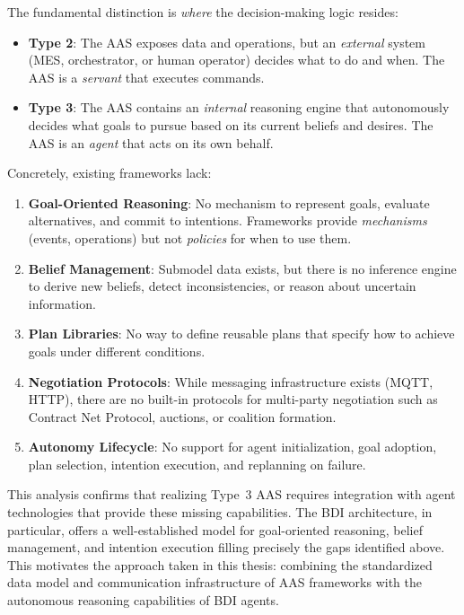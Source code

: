 The fundamental distinction is \textit{where} the decision-making logic resides:

\begin{itemize}
    \item \textbf{Type 2}: The \ac{AAS} exposes data and operations, but an \textit{external} system (MES, orchestrator, or human operator) decides what to do and when. The \ac{AAS} is a \textit{servant} that executes commands.
    
    \item \textbf{Type 3}: The \ac{AAS} contains an \textit{internal} reasoning engine that autonomously decides what goals to pursue based on its current beliefs and desires. The \ac{AAS} is an \textit{agent} that acts on its own behalf.
\end{itemize}

Concretely, existing frameworks lack:
\begin{enumerate}
    \item \textbf{Goal-Oriented Reasoning}: No mechanism to represent goals, evaluate alternatives, and commit to intentions. Frameworks provide \textit{mechanisms} (events, operations) but not \textit{policies} for when to use them.
    
    \item \textbf{Belief Management}: Submodel data exists, but there is no inference engine to derive new beliefs, detect inconsistencies, or reason about uncertain information.
    
    \item \textbf{Plan Libraries}: No way to define reusable plans that specify how to achieve goals under different conditions.
    
    \item \textbf{Negotiation Protocols}: While messaging infrastructure exists (MQTT, HTTP), there are no built-in protocols for multi-party negotiation such as Contract Net Protocol, auctions, or coalition formation.
    
    \item \textbf{Autonomy Lifecycle}: No support for agent initialization, goal adoption, plan selection, intention execution, and replanning on failure.
\end{enumerate}

This analysis confirms that realizing Type~3 \ac{AAS} requires integration with agent technologies that provide these missing capabilities. The \ac{BDI} architecture, in particular, offers a well-established model for goal-oriented reasoning, belief management, and intention execution filling precisely the gaps identified above. This motivates the approach taken in this thesis: combining the standardized data model and communication infrastructure of \ac{AAS} frameworks with the autonomous reasoning capabilities of \ac{BDI} agents.

